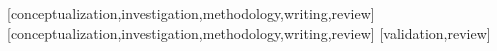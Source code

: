 \documentclass[portuguese]{textolivre}
\begin{document}
\printbibliography\label{sec-bib}
\begin{contributors}
[conceptualization,investigation,methodology,writing,review]
[conceptualization,investigation,methodology,writing,review]
[validation,review]
\end{contributors}
\end{document}
